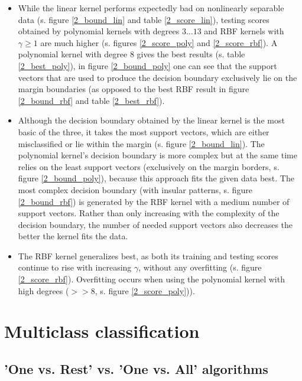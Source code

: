 \documentclass{article}
\begin{document}
\begin{itemize}
\item While the linear kernel performs expectedly bad on nonlinearly separable data (s. figure \ref{2_bound_lin} and table \ref{2_score_lin}), testing scores obtained by polynomial kernels with degrees $3 \dots 13$ and RBF kernels with $\gamma \geq 1 $ are much higher (s. figures \ref{2_score_poly} and \ref{2_score_rbf}). A polynomial kernel with degree $8$ gives the best results (s. table \ref{2_best_poly}), in figure \ref{2_bound_poly} one can see that the support vectors that are used to produce the decision boundary exclusively lie on the margin boundaries (as opposed to the best RBF result in figure \ref{2_bound_rbf} and table \ref{2_best_rbf}).

\item Although the decision boundary obtained by the linear kernel is the most basic of the three, it takes the most support vectors, which are either misclassified or lie within the margin (s. figure \ref{2_bound_lin}). The polynomial kernel's decision boundary is more complex but at the same time relies on the least support vectors (exclusively on the margin borders, s. figure \ref{2_bound_poly}), because this approach fits the given data best. The most complex decision boundary (with insular patterns, s. figure \ref{2_bound_rbf}) is generated by the RBF kernel with a medium number of support vectors. Rather than only increasing with the complexity of the decision boundary, the number of needed support vectors also decreases the better the kernel fits the data.

\item The RBF kernel generalizes best, as both its training and testing scores continue to rise with increasing $\gamma$, without any overfitting (s. figure \ref{2_score_rbf}). Overfitting occurs when using the polynomial kernel with high degrees ($>>8$, s. figure \ref{2_score_poly})).

\end{itemize}

\clearpage
\section{Multiclass classification}

\subsection{'One vs. Rest' vs. 'One vs. All' algorithms}
\end{document}
